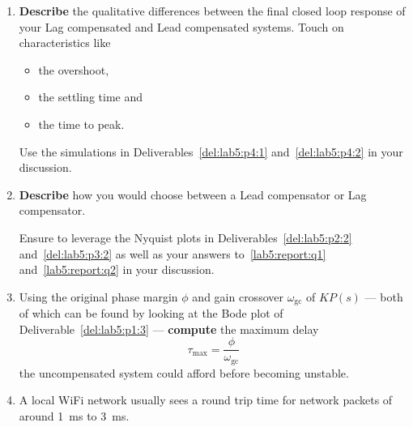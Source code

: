\begin{deliverable}[label={lab5:report}]
  \begin{enumerate}[label={(\arabic*)}]
    \item{%
      \textbf{Describe} the qualitative differences between the final closed loop response of your Lag compensated and Lead compensated systems.
      Touch on characteristics like
      \begin{itemize}
        \item{
          the overshoot,
        }
        \item{
          the settling time and
        }
        \item{
          the time to peak.
        }
      \end{itemize}
      Use the simulations in Deliverables~\ref{del:lab5:p4:1} and~\ref{del:lab5:p4:2} in your discussion.
      \label{lab5:report:q2}
    }
    \item{%
      \textbf{Describe} how you would choose between a Lead compensator or Lag compensator.

      Ensure to leverage the Nyquist plots in Deliverables~\ref{del:lab5:p2:2} and~\ref{del:lab5:p3:2} as well as your answers to~\ref{lab5:report:q1} and~\ref{lab5:report:q2} in your discussion.

      \label{lab5:report:q3}
    }
    \item{%
      Using the original phase margin \(\phi\) and gain crossover \(\omega_\mathrm{gc}\) of \(K P(s)\) --- both of which can be found by looking at the Bode plot of Deliverable~\ref{del:lab5:p1:3} --- \textbf{compute} the maximum delay
      \[
        \tau_\mathrm{max} = \frac{\phi}{\omega_\mathrm{gc}}
      \]
      the uncompensated system could afford before becoming unstable.
      \label{lab5:report:q4}
    }
    \item{%
      A local WiFi network usually sees a round trip time for network packets of around \SI{1}{\milli\second} to \SI{3}{\milli\second}.

}
\end{enumerate}
\end{deliverable}
